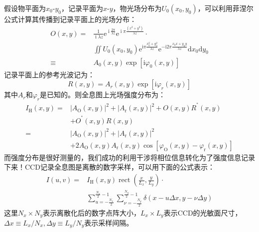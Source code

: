 \documentclass{WHUReport}
\begin{document}
\begin{multicols}{2}
	假设物平面为$x_0\mbox{-}y_0$，记录平面为$x\mbox{-}y$，物光场分布为$U_0(x_0,y_0)$，可以利用菲涅尔公式计算其传播到记录平面上的光场分布：
	\begin{equation}
		\begin{aligned}
			O(x,y)=& \frac{1}{\operatorname{i}\lambda {z}}\mathrm{e}^{\operatorname{i}\frac{2\pi}{\lambda z}}\mathrm{e}^{\operatorname{i}\pi\frac{(x^2+y^2)}{\lambda  z}}\cdot\\
			&\iint U_0(x_0,y_0)\mathrm{e}^{\mathrm{i}\pi{\frac{x_0^2+y_0^2}{\lambda  z}}}\mathrm{e}^{-\mathrm{i}2\pi\frac{x_0x+y_0y}{\lambda z}}\mathrm{d}x_0\mathrm{d}y_0\\
			\equiv&A_{0}(x,y)\exp[\mathrm{i}\varphi_{0}(x,y)]
		\end{aligned}
	\end{equation}
	记录平面上的参考光波记为：
	\begin{equation}
		R(x,y)=A_{r}(x,y)\exp[\mathrm{i}\varphi_{r}(x,y)]
	\end{equation}
	其中$A_r$和$\varphi_r$是已知的。则全息图上光场强度分布为：
	\begin{equation}
		\begin{aligned}I_{\mathrm{H}}(x,y)=&\left|A_{\mathrm{O}}(x,y)\right|^2+\left|A_{\mathrm{r}}(x,y)\right|^2+O(x,y)R^{^*}(x,y)\\&+O^{^*}(x,y)R(x,y)\\=&\left|A_{\mathrm{O}}(x,y)\right|^2+\left|A_{\mathrm{r}}(x,y)\right|^2\\&+2A_{\mathrm{O}}(x,y)A_{\mathrm{r}}(x,y)\cos[\varphi_{\mathrm{O}}(x,y)-\varphi_{\mathrm{r}}(x,y)]\end{aligned}
	\end{equation}
	而强度分布是很好测量的，我们成功的利用干涉将相位信息转化为了强度信息记录下来！CCD记录全息图是离散的数字采样，可以用下面的公式表示：
	\begin{equation}
		\begin{aligned}
			I(u,v)=&I_{\mathrm{H}}(x,y)\operatorname{rect}(\frac{x}{L_x},\frac{y}{L_y})\cdot\\&\sum_{u=-\frac{N_x}2}^{\frac{N_x}2-1}\sum_{\nu=-\frac{N_y}2}^{\frac{N_y}2-1}\delta(x-u\Delta x,y-\nu\Delta y)
		\end{aligned}
	\end{equation}
	这里$N_x\times N_y$表示离散化后的数字点阵大小，$L_x\times L_y$表示CCD的光敏面尺寸，$\Delta x\equiv L_x/N_x,\Delta y\equiv L_y/N_y$表示采样间隔。
	

\end{multicols}
\end{document}
